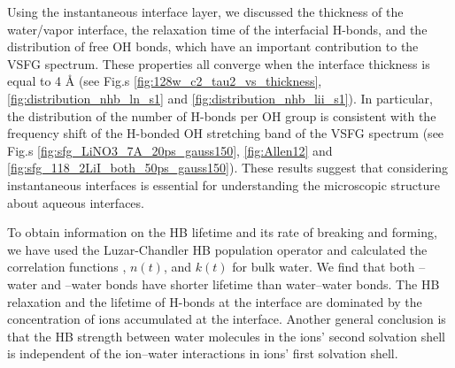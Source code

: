 Using the instantaneous interface layer, we discussed
the thickness of the water/vapor interface, the relaxation time of the interfacial H-bonds, 
and the distribution of free OH bonds, which have an important contribution to the VSFG spectrum.
These properties all converge when the interface thickness is equal to 4 \AA 
(see Fig.s \ref{fig:128w_c2_tau2_vs_thickness}, \ref{fig:distribution_nhb_ln_s1} and \ref{fig:distribution_nhb_lii_s1}). 
In particular, the distribution of the number of H-bonds per OH group is consistent with the frequency shift of the H-bonded OH stretching band of the VSFG spectrum 
(see Fig.s \ref{fig:sfg_LiNO3_7A_20ps_gauss150}, \ref{fig:Allen12} and \ref{fig:sfg_118_2LiI_both_50ps_gauss150}).
These results suggest that considering instantaneous interfaces is essential for understanding the microscopic structure about aqueous interfaces.

To obtain information on the HB lifetime and its rate of breaking and forming, we have used the Luzar-Chandler HB population operator and calculated the correlation functions \CHB, $n(t)$, and $k(t)$ for bulk water. 
We find that both \nitrate--water and \I--water bonds have shorter lifetime than water--water bonds.
The HB relaxation and the lifetime of H-bonds
at the interface are dominated by the concentration of ions accumulated at the interface. 
Another general conclusion is that the HB strength between water molecules in the ions' second solvation shell is independent 
of the ion--water interactions in ions' first solvation shell.

